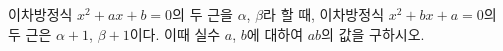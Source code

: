 이차방정식 $x^2+ax+b=0$의 두 근을 $\alpha$, $\beta$라 할 때, 이차방정식 $x^2+bx+a=0$의 두 근은 $\alpha+1$, $\beta+1$이다. 이때 실수 $a$, $b$에 대하여 $ab$의 값을 구하시오.
